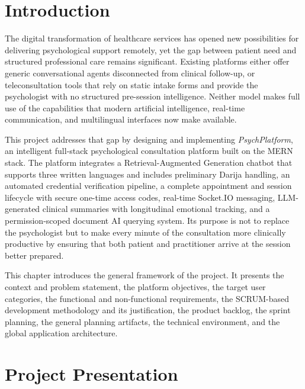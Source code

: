 \documentclass[a4paper,12pt]{report}
\begin{document}
\section{Introduction}

The digital transformation of healthcare services has opened new possibilities for delivering psychological support remotely, yet the gap between patient need and structured professional care remains significant. Existing platforms either offer generic conversational agents disconnected from clinical follow-up, or teleconsultation tools that rely on static intake forms and provide the psychologist with no structured pre-session intelligence. Neither model makes full use of the capabilities that modern artificial intelligence, real-time communication, and multilingual interfaces now make available.

This project addresses that gap by designing and implementing \emph{PsychPlatform}, an intelligent full-stack psychological consultation platform built on the MERN stack. The platform integrates a Retrieval-Augmented Generation chatbot that supports three written languages and includes preliminary Darija handling, an automated credential verification pipeline, a complete appointment and session lifecycle with secure one-time access codes, real-time Socket.IO messaging, LLM-generated clinical summaries with longitudinal emotional tracking, and a permission-scoped document AI querying system. Its purpose is not to replace the psychologist but to make every minute of the consultation more clinically productive by ensuring that both patient and practitioner arrive at the session better prepared.

This chapter introduces the general framework of the project. It presents the context and problem statement, the platform objectives, the target user categories, the functional and non-functional requirements, the SCRUM-based development methodology and its justification, the product backlog, the sprint planning, the general planning artifacts, the technical environment, and the global application architecture.

\section{Project Presentation}
\end{document}
